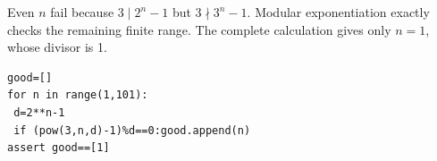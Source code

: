 Even $n$ fail because $3\mid2^n-1$ but $3\nmid3^n-1$. Modular exponentiation exactly checks the remaining finite range. The complete calculation gives only $\boxed{n=1}$, whose divisor is 1.\begin{verbatim}
good=[]
for n in range(1,101):
 d=2**n-1
 if (pow(3,n,d)-1)%d==0:good.append(n)
assert good==[1]
\end{verbatim}
